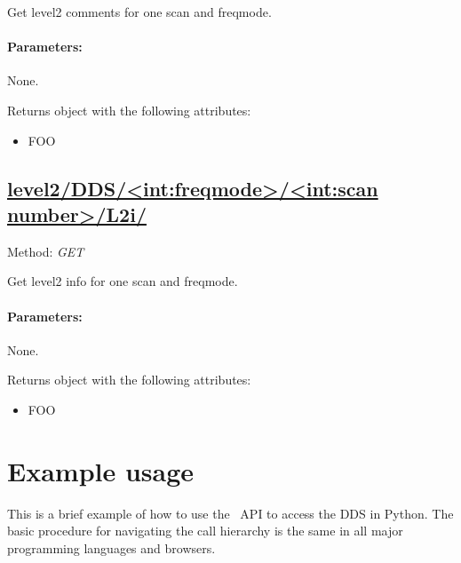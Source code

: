 Get level2 comments for one scan and freqmode.

\paragraph{Parameters:} None.

Returns object with the following attributes:
\begin{itemize}
    \item FOO
\end{itemize}


\subsection{\url{level2/DDS/<int:freqmode>/<int:scan number>/L2i/}}
Method: \emph{GET}

Get level2 info for one scan and freqmode.

\paragraph{Parameters:} None.

Returns object with the following attributes:
\begin{itemize}
    \item FOO
\end{itemize}

\section{Example usage}
\label{sec:api_usage}
This is a brief example of how to use the \smr~API to access the DDS in Python.
The basic procedure for navigating the call hierarchy is the same in all major
programming languages and browsers.

%

